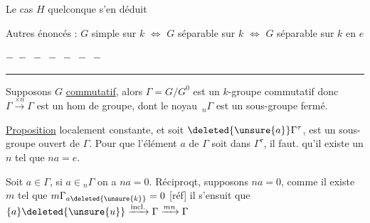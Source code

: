 Le cas $H$ quelconque s'en déduit

 Autres énoncés : $G$ simple sur $k$
$\Longleftrightarrow$ $G$ séparable sur $k$ \unsure{;|,} $\Longleftrightarrow$ $G$ séparable sur $k$ en $e$

\begin{center}$-\;-\;-\;-\;-\;-\;-$\\[-2pt]\rule{2.5cm}{0.3pt}\end{center}

Supposons $G$ \uline{commutatif},  alors
$\Gamma=G/G^0$ est un  $k$-groupe commutatif 
donc $\Gamma\xrightarrow{\times n}\Gamma$ est un hom de groupe,
dont le noyau $\,{}_n\Gamma$ est un sous-groupe
fermé.

\uline{Proposition}  
localement constante, et 
soit $\deleted{\unsure{a}}\Gamma^\tau$, est un sous-groupe ouvert de
$\Gamma$. Pour que  l'élément $a$ de $\Gamma$
soit dans $\Gamma^\tau$, il faut.  qu'il
existe un $n$ tel que $na=e$.

Soit $a\in\Gamma$,  si $a\in{}_n\Gamma$ on a
$na=0$. Réciproqt, supposons $na=0$,
comme il existe $m$ tel que $m\Gamma_{a\deleted{\unsure{k}}}=0$
[réf] il s'ensuit que  $\{a\}\deleted{\unsure{u}}\xrightarrow{\mathrm{incl.}}\Gamma\xrightarrow{mn}\Gamma$
